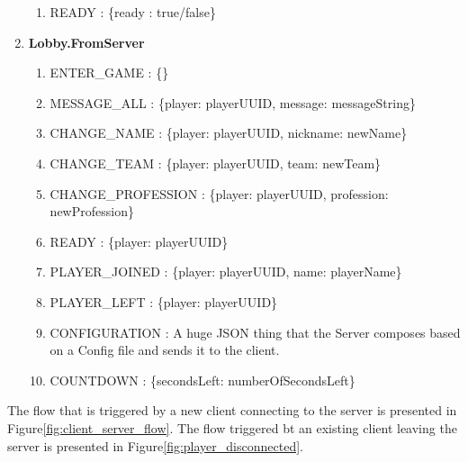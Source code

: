 \begin{enumerate}
\begin{enumerate}
	\item READY :
	\{ready : true/false\}    
     
  \end{enumerate}
  
  
  \item \textbf{Lobby.FromServer}
  
  \begin{enumerate}
    	\item ENTER\_GAME :
    	\{\}
		
		\item MESSAGE\_ALL :
		\{player: playerUUID, message: messageString\}
		
		\item CHANGE\_NAME :
		\{player: playerUUID, nickname: newName\}
		
		\item CHANGE\_TEAM :
		\{player: playerUUID, team: newTeam\}
				
		\item CHANGE\_PROFESSION :
		\{player: playerUUID, profession: newProfession\}
		
		\item READY :
		\{player: playerUUID\}
										
		\item PLAYER\_JOINED :
		\{player: playerUUID, name: playerName\}
		
		\item PLAYER\_LEFT :
		\{player: playerUUID\}
			
		\item CONFIGURATION :
		A huge JSON thing that the Server composes based on a Config file and sends it
		to the client. 
		
		\item COUNTDOWN :
		\{secondsLeft: numberOfSecondsLeft\}
		
  \end{enumerate}  
  
\end{enumerate}

The flow that is triggered by a new client connecting to the server is
presented in Figure\ref{fig:client_server_flow}. The flow triggered bt an existing client leaving the
server is presented in Figure\ref{fig:player_disconnected}.

